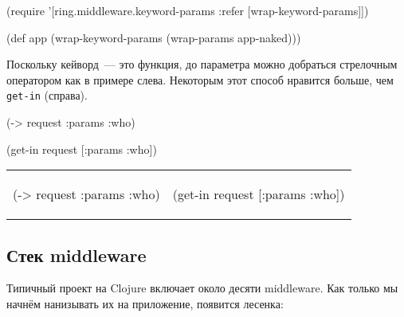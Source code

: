 
\begin{english}
  \begin{clojure}
(require '[ring.middleware.keyword-params
           :refer [wrap-keyword-params]])

(def app (wrap-keyword-params
           (wrap-params app-naked)))
  \end{clojure}
\end{english}


Поскольку кейворд~--- это функция, до параметра можно добраться стрелочным
оператором как в примере слева. Некоторым этот способ нравится больше, чем
\verb|get-in| (справа).

\ifnarrow

\begin{english}
  \begin{clojure}
(-> request :params :who)
  \end{clojure}

\splitter

  \begin{clojure}
(get-in request [:params :who])
  \end{clojure}
\end{english}

\else

\begin{english}

\noindent
\begin{tabular}{ @{}p{5cm} @{}p{5cm} }

  \begin{clojure}
(-> request :params :who)
  \end{clojure}

&

  \begin{clojure}
(get-in request [:params :who])
  \end{clojure}

\end{tabular}

\end{english}

\fi

\subsection{Стек middleware}

Типичный проект на Clojure включает около десяти middleware. Как только мы
начнём нанизывать их на приложение, появится лесенка:

